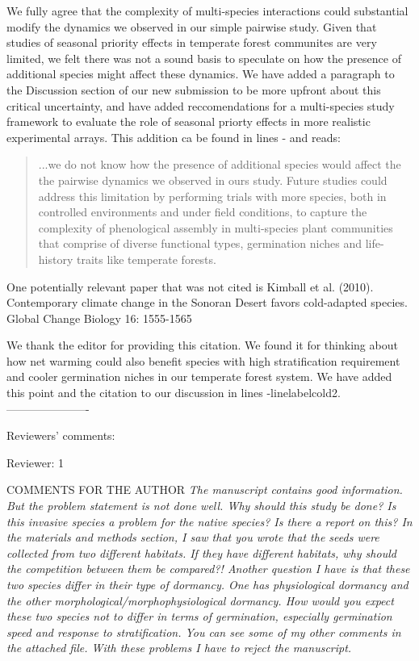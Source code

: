 \documentclass[11pt]{article}
\begin{document}
We fully agree that the complexity of multi-species interactions could substantial modify the dynamics we observed in our simple pairwise study. Given that studies of seasonal priority effects in temperate forest communites are very limited, we felt there was not a sound basis to speculate on how the presence of additional species might affect these dynamics. We have added a paragraph to the Discussion section of our new submission to be more upfront about this critical uncertainty, and have added reccomendations for a multi-species study framework to evaluate the role of seasonal priorty effects in more realistic experimental arrays. This addition ca be found in lines - and reads:
\begin{quote}...we do not know how the presence of additional species would affect the the pairwise dynamics we observed in ours study. Future studies could address this limitation by performing trials with more species, both in controlled environments and under field conditions, to capture the complexity of phenological assembly in multi-species plant communities that comprise of diverse functional types, germination niches and life-history traits like temperate forests.\end{quote}



One potentially relevant paper that was not cited is Kimball et al. (2010). Contemporary climate change in the Sonoran Desert favors cold-adapted species. Global Change Biology 16: 1555-1565

We thank the editor for providing this citation. We found it for thinking about how net warming could also benefit species with high stratification requirement and cooler germination niches in our temperate forest system. We have added this point and the citation to our discussion in lines -linelabel{cold2}.
----------------------

Reviewers’ comments:

Reviewer: 1

COMMENTS FOR THE AUTHOR
\emph{The manuscript contains good information. But the problem statement is not done well. Why should this study be done? Is this invasive species a problem for the native species? Is there a report on this? In the materials and methods section, I saw that you wrote that the seeds were collected from two different habitats. If they have different habitats, why should the competition between them be compared?! Another question I have is that these two species differ in their type of dormancy. One has physiological dormancy and the other morphological/morphophysiological dormancy. How would you expect these two species not to differ in terms of germination, especially germination speed and response to stratification. You can see some of my other comments in the attached file. With these problems I have to reject the manuscript.}
\end{document}

